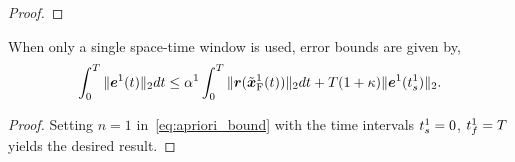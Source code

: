 \begin{proof}
\begin{comment}
Thus,
\begin{equation*}
\intSlabArg{n} \norm{\errorArg{n}} dt \le  \errorConstantArg{}\norm{\stateROMSolArgt{n}{ \timeStartArg{n}} - \stateFOMSolArgt{n-1}{\timeEndArg{n-1}} } + \lipshitzi \intSlabArg{n} \norm{ \resid(\stateFOMProjSolArg{n}) } dt.
\end{equation*}
Applying A4:
\begin{equation*}
\intSlabArg{n} \norm{\errorArg{n}} dt \le  \errorConstantArg{} \constAInt \intSlabArg{n-1} \norm{\errorArg{n-1}} + \lipshitzi \intSlabArg{n} \norm{ \resid(\stateFOMProjSolArg{n}) } dt.
\end{equation*}
Thus,
\begin{equation*}
\intSlabArg{n} \norm{\errorArg{}} dt \le \sum_{i=1}^{n}  (\errorConstantArg{} \constAInt )^{n-1} \lipshitzi \intSlabArg{i} \norm{\resid(\stateFOMProjSolArg{i})} dt + 
(\errorConstantArg{})^n \norm{\errorArg{}} 
\end{equation*}
Summing over windows to obtain an error bound for the entire time interval,
\end{comment}
\end{proof}

\begin{corollary}
When only a single space-time window is used, error bounds are given by,
\begin{equation*}
\int_0^T \| \boldsymbol e^{1}(t) \|_2 dt \le \alpha^{1} \int_0^T \| \boldsymbol r(\tilde{\boldsymbol x}_{\text{F}}^{1}(t)) \|_2dt +
 T (1 + \kappa) \| \boldsymbol e^{1}(t_s^{1})  \|_2 .
\end{equation*}
\end{corollary}
\begin{proof}
Setting $n=1$ in~\eqref{eq:apriori_bound} with the time intervals $t_s^{1}=0$, $t_f^{1}=T$ yields the desired result.
\end{proof}

